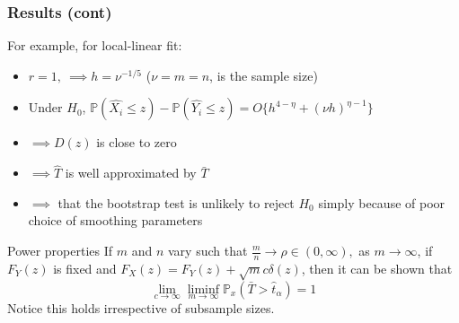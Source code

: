 \documentclass[10pt,dvipsnames,table]{beamer}
\newcommand{\Prob}{\mathds{P}}
\begin{document}
\begin{frame}
\frametitle{Results (cont)}
For example, for local-linear fit: 
\begin{itemize}
\item  $r = 1,\ \implies h = \nu^{-1/5}$ \hspace{1in} ($\nu = m = n$, is the sample size)
\item  Under $H_0$, $\Prob(\hat{X_i} \leq z) - \Prob(\hat{Y_i} \leq z) = O\{h^{4 - \eta} + (\nu h)^{\eta - 1}\}$ 
\item  $\implies D(z)$ is close to zero
\item  $\implies \hat{T}$ is well approximated by $\bar{T}$
\item  $\implies$ that the bootstrap test is unlikely to reject $H_0$ simply because of poor choice of smoothing parameters
\end{itemize}

\begin{block}{Power properties}
If $m$ and $n$ vary such that $\frac{m}{n} \rightarrow \rho \in (0, \infty),$ as $m \rightarrow \infty$, if $F_Y(z)$ is fixed and $F_X(z) = F_Y(z) + \sqrt{m}c\delta(z)$, then it can be shown that \[\lim_{c \rightarrow \infty} \liminf\limits_{m \rightarrow \infty} \Prob_x(\bar{T} > \hat{t}_{\alpha}) = 1\]
Notice this holds irrespective of subsample sizes.
\end{block}
\end{frame}

\end{document}
